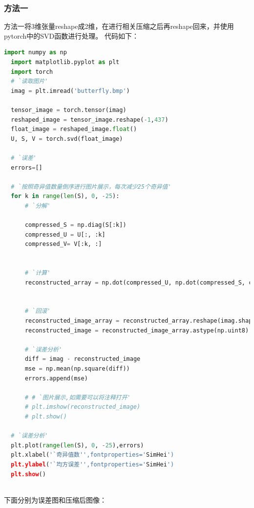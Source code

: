 \documentclass[UTF8]{ctexart}
\begin{document}
\subsubsection{方法一}
方法一将3维张量reshape成2维，在进行相关压缩之后再reshape回来，并使用pytorch中的SVD函数进行处理。
代码如下：
\begin{lstlisting}[language=Python]
  import numpy as np
  import matplotlib.pyplot as plt
  import torch
  # `读取图片'
  imag = plt.imread('butterfly.bmp')
  
  tensor_image = torch.tensor(imag)
  reshaped_image = tensor_image.reshape(-1,437)
  float_image = reshaped_image.float()
  U, S, V = torch.svd(float_image)
  
  # `误差'
  errors=[]
  
  # `按照奇异值数量倒序进行图片展示，每次减少25个奇异值'
  for k in range(len(S), 0, -25):
      # `分解'
      
      compressed_S = np.diag(S[:k])
      compressed_U = U[:, :k]
      compressed_V= V[:k, :]
  
  
      # `计算'
      reconstructed_array = np.dot(compressed_U, np.dot(compressed_S, compressed_V))
      
  
      # `回滚'
      reconstructed_image_array = reconstructed_array.reshape(imag.shape)
      reconstructed_image = reconstructed_image_array.astype(np.uint8)
      
      # `误差分析'
      diff = imag - reconstructed_image
      mse = np.mean(np.square(diff))
      errors.append(mse)
      
      # # `图片展示,如需要可以将注释打开'
      # plt.imshow(reconstructed_image)
      # plt.show()
  
  # `误差分析'
  plt.plot(range(len(S), 0, -25),errors)
  plt.xlabel('`奇异值数'',fontproperties='SimHei')
  plt.ylabel('`均方误差'',fontproperties='SimHei')
  plt.show()
  
  \end{lstlisting}
  下面分别为误差图和压缩后图像：
\end{document}
